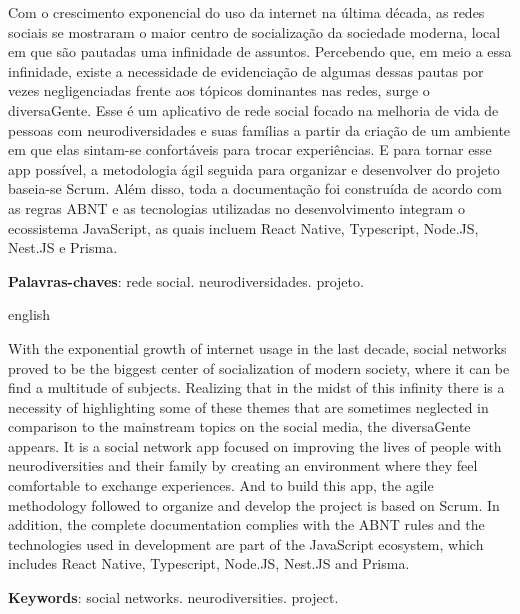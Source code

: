 
\setlength{\absparsep}{18pt} %
\begin{resumo}

Com o crescimento exponencial do uso da internet na última década, as redes sociais se mostraram o maior centro de socialização da sociedade moderna, local em que são pautadas uma infinidade de assuntos. Percebendo que, em meio a essa infinidade, existe a necessidade de evidenciação de algumas dessas pautas por vezes negligenciadas frente aos tópicos dominantes nas redes, surge o diversaGente. Esse é um aplicativo de rede social focado na melhoria de vida de pessoas com neurodiversidades e suas famílias a partir da criação de um ambiente em que elas sintam-se confortáveis para trocar experiências. E para tornar esse app possível, a metodologia ágil seguida para organizar e desenvolver do projeto baseia-se Scrum. Além disso, toda a documentação foi construída de acordo com as regras \ac{ABNT} e as tecnologias utilizadas no desenvolvimento integram o ecossistema JavaScript, as quais incluem React Native, Typescript, Node.JS, Nest.JS e Prisma.

 \textbf{Palavras-chaves}: rede social. neurodiversidades. projeto.

\end{resumo}

\begin{resumo}[Abstract]
 \begin{otherlanguage*}{english}

With the exponential growth of internet usage in the last decade, social networks proved to be the biggest center of socialization of modern society, where it can be find a multitude of subjects. Realizing that in the midst of this infinity there is a necessity of highlighting some of these themes that are sometimes neglected in comparison to the mainstream topics on the social media, the diversaGente appears. It is a social network app focused on improving the lives of people with neurodiversities and their family by creating an environment where they feel comfortable to exchange experiences. And to build this app, the agile methodology followed to organize and develop the project is based on Scrum. In addition, the complete documentation complies with the \ac{ABNT} rules and the technologies used in development are part of the JavaScript ecosystem, which includes React Native, Typescript, Node.JS, Nest.JS and Prisma.

   \textbf{Keywords}: social networks. neurodiversities. project.
 \end{otherlanguage*}
\end{resumo}